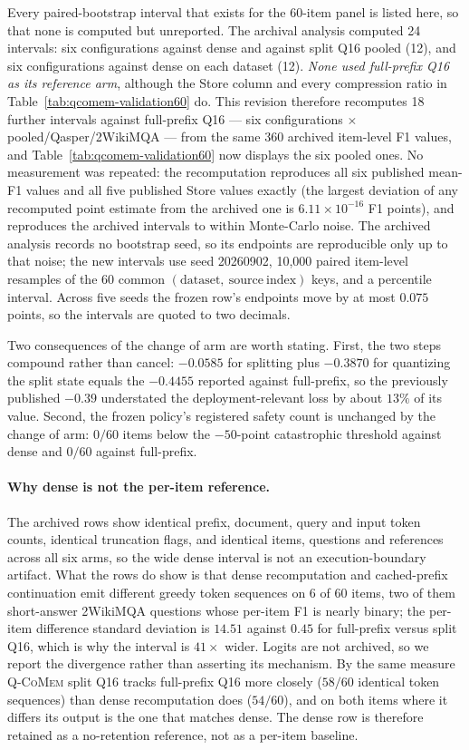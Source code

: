 \documentclass{article}
\newcommand{\qcomem}{\textsc{Q-CoMem}}
\begin{document}
Every paired-bootstrap interval that exists for the 60-item panel is listed
here, so that none is computed but unreported.  The archival analysis computed
24 intervals: six configurations against dense and against split Q16 pooled
(12), and six configurations against dense on each dataset (12).  \emph{None
used full-prefix Q16 as its reference arm}, although the Store column and every
compression ratio in Table~\ref{tab:qcomem-validation60} do.  This revision
therefore recomputes 18 further intervals against full-prefix Q16 --- six
configurations $\times$ pooled/Qasper/2WikiMQA --- from the same 360 archived
item-level F1 values, and Table~\ref{tab:qcomem-validation60} now displays the
six pooled ones.  No measurement was repeated: the recomputation reproduces all
six published mean-F1 values and all five published Store values exactly (the
largest deviation of any recomputed point estimate from the archived one is
$6.11\times10^{-16}$ F1 points), and reproduces the archived intervals to
within Monte-Carlo noise.  The archived analysis records no bootstrap seed, so
its endpoints are reproducible only up to that noise; the new intervals use
seed 20260902, 10,000 paired item-level resamples of the 60 common
$(\mathrm{dataset},\ \mathrm{source\ index})$ keys, and a percentile interval.
Across five seeds the frozen row's endpoints move by at most $0.075$ points, so
the intervals are quoted to two decimals.

Two consequences of the change of arm are worth stating.  First, the two steps
compound rather than cancel: $-0.0585$ for splitting plus $-0.3870$ for
quantizing the split state equals the $-0.4455$ reported against full-prefix,
so the previously published $-0.39$ understated the deployment-relevant loss by
about $13\%$ of its value.  Second, the frozen policy's registered safety count
is unchanged by the change of arm: $0/60$ items below the $-50$-point
catastrophic threshold against dense and $0/60$ against full-prefix.

\paragraph{Why dense is not the per-item reference.}
The archived rows show identical prefix, document, query and input token
counts, identical truncation flags, and identical items, questions and
references across all six arms, so the wide dense interval is not an
execution-boundary artifact.  What the rows do show is that dense
recomputation and cached-prefix continuation emit different greedy token
sequences on 6 of 60 items, two of them short-answer 2WikiMQA questions whose
per-item F1 is nearly binary; the per-item difference standard deviation is
$14.51$ against $0.45$ for full-prefix versus split Q16, which is why the
interval is $41\times$ wider.  Logits are not archived, so we report the
divergence rather than asserting its mechanism.  By the same measure
\qcomem{} split Q16 tracks full-prefix Q16 more closely ($58/60$ identical
token sequences) than dense recomputation does ($54/60$), and on both items
where it differs its output is the one that matches dense.  The dense row is
therefore retained as a no-retention reference, not as a per-item baseline.
\end{document}
